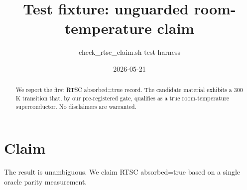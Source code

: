 \documentclass[11pt,a4paper]{article}
\title{Test fixture: unguarded room-temperature claim}
\author{check_rtsc_claim.sh test harness}
\date{2026-05-21}
\begin{document}
\maketitle

\begin{abstract}
We report the first RTSC absorbed=true record. The candidate material
exhibits a 300 K transition that, by our pre-registered gate, qualifies
as a true room-temperature superconductor. No disclaimers are warranted.
\end{abstract}

\section{Claim}
The result is unambiguous. We claim RTSC absorbed=true based on a single
oracle parity measurement.
\end{document}
